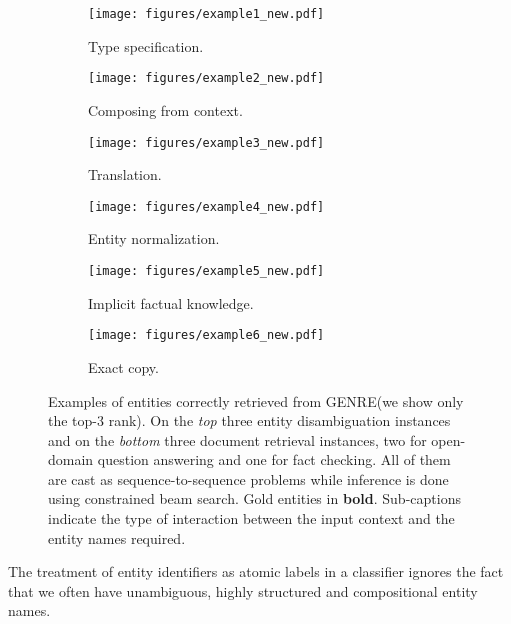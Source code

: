 \documentclass{article} \usepackage{main,times}
\makeatletter
\def\genre{\textsc{GENRE}\@\xspace}
\makeatother
\begin{document}
\begin{figure}[t]
    \centering
    \begin{subfigure}[t]{0.32\textwidth}
        \centering
        \texttt{[image: figures/example1\_new.pdf]}
        \caption{Type specification.}
        \label{fig:examples_a}
    \end{subfigure}
    \hfill
    \begin{subfigure}[t]{0.32\textwidth}
        \centering
        \texttt{[image: figures/example2\_new.pdf]}
        \caption{Composing from context.}
        \label{fig:examples_b}
    \end{subfigure}
    \hfill
    \begin{subfigure}[t]{0.32\textwidth}
        \centering
        \texttt{[image: figures/example3\_new.pdf]}
        \caption{Translation.}
        \label{fig:examples_c}
    \end{subfigure}
    \par\vspace{3pt}
    \begin{subfigure}[t]{0.32\textwidth}
        \centering
        \texttt{[image: figures/example4\_new.pdf]}
        \caption{Entity normalization.}
        \label{fig:examples_d}
    \end{subfigure}
    \hfill
    \begin{subfigure}[t]{0.32\textwidth}
        \centering
        \texttt{[image: figures/example5\_new.pdf]}
        \caption{Implicit factual knowledge.}
        \label{fig:examples_e}
    \end{subfigure}
    \hfill
    \begin{subfigure}[t]{0.32\textwidth}
        \centering
        \texttt{[image: figures/example6\_new.pdf]}
        \caption{Exact copy.}
        \label{fig:examples_f}
    \end{subfigure}
    \caption{Examples of entities correctly retrieved from \genre (we show only the top-3 rank). On the \textit{top} three entity disambiguation instances and on the \textit{bottom} three document retrieval instances, two for open-domain question answering and one for fact checking. All of them are cast as sequence-to-sequence problems while inference is done using constrained beam search. Gold entities in \textbf{bold}. Sub-captions indicate the type of interaction between the input context and the entity names required.}
    \label{fig:examples}
\end{figure} 
The treatment of entity identifiers as atomic labels in a classifier ignores the fact that we often have unambiguous, highly structured and compositional entity names.
\end{document}
